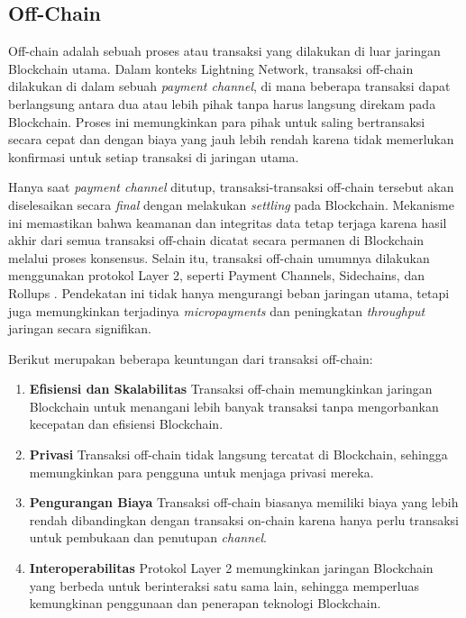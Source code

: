 \subsection{Off-Chain}
\label{subsec:offchain}

Off-chain adalah sebuah proses atau transaksi yang dilakukan di luar jaringan Blockchain utama. Dalam konteks Lightning Network, transaksi off-chain dilakukan di dalam sebuah \textit{payment channel}, di mana beberapa transaksi dapat berlangsung antara dua atau lebih pihak tanpa harus langsung direkam pada Blockchain. Proses ini memungkinkan para pihak untuk saling bertransaksi secara cepat dan dengan biaya yang jauh lebih rendah karena tidak memerlukan konfirmasi untuk setiap transaksi di jaringan utama.

Hanya saat \textit{payment channel} ditutup, transaksi-transaksi off-chain tersebut akan diselesaikan secara \textit{final} dengan melakukan \textit{settling} pada Blockchain. Mekanisme ini memastikan bahwa keamanan dan integritas data tetap terjaga karena hasil akhir dari semua transaksi off-chain dicatat secara permanen di Blockchain melalui proses konsensus. Selain itu, transaksi off-chain umumnya dilakukan menggunakan protokol Layer 2, seperti Payment Channels, Sidechains, dan Rollups \parencite{sguanci2021layer}. Pendekatan ini tidak hanya mengurangi beban jaringan utama, tetapi juga memungkinkan terjadinya \textit{micropayments} dan peningkatan \textit{throughput} jaringan secara signifikan.

Berikut merupakan beberapa keuntungan dari transaksi off-chain:

\begin{enumerate}
	\item \textbf{Efisiensi dan Skalabilitas} \newline
	      Transaksi off-chain memungkinkan jaringan Blockchain untuk menangani lebih banyak transaksi tanpa mengorbankan kecepatan dan efisiensi Blockchain.
	\item \textbf{Privasi} \newline
	      Transaksi off-chain tidak langsung tercatat di Blockchain, sehingga memungkinkan para pengguna untuk menjaga privasi mereka.
	\item \textbf{Pengurangan Biaya} \newline
	      Transaksi off-chain biasanya memiliki biaya yang lebih rendah dibandingkan dengan transaksi on-chain karena hanya perlu transaksi untuk pembukaan dan penutupan \textit{channel}.
	\item \textbf{Interoperabilitas} \newline
	      Protokol Layer 2 memungkinkan jaringan Blockchain yang berbeda untuk berinteraksi satu sama lain, sehingga memperluas kemungkinan penggunaan dan penerapan teknologi Blockchain.
\end{enumerate}
